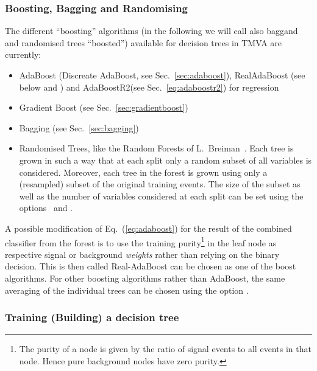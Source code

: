 \subsubsection{Boosting, Bagging and Randomising}

The different ``boosting'' algorithms (in the following we will 
call also baggand and randomised trees ``boosted'') available
for decision trees in TMVA are currently:
\begin{itemize}
\item AdaBoost (Discreate AdaBoost, see Sec.~\ref{sec:adaboost}),  RealAdaBoost (see below and \cite{RealAdaBoost}) and AdaBoostR2(see Sec.~\ref{eq:adaboostr2}) for regression
\item Gradient Boost (see Sec.~\ref{sec:gradientboost})
\item Bagging (see Sec.~\ref{sec:bagging})
\item Randomised Trees, like the Random Forests of L.~Breiman~\cite{Breiman2001}. 
  Each tree is grown in such a way that at each split only a random
  subset of all variables is considered. Moreover, each tree in the forest
  is grown using only a (resampled) subset of the original training events.
  The size of the subset as well as the number of variables considered at each
  split can be set using the options~ and .
\end{itemize}

A possible modification of Eq.~(\ref{eq:adaboost}) for the result of
the combined classifier from the forest is to use the training
purity\footnote { The purity of a node is given by the ratio of signal
  events to all events in that node. Hence pure background nodes have
  zero purity.  }  in the leaf node as respective signal or background
{\em weights} rather than relying on the binary decision. This is then
called Real-AdaBoost can be chosen as one of the boost algorithms. For
other boosting algorithms rather than AdaBoost, the same averaging of
the individual trees can be chosen using the option
 .


\subsubsection*{Training (Building) a decision tree}
\label{sec:treebuilding}

